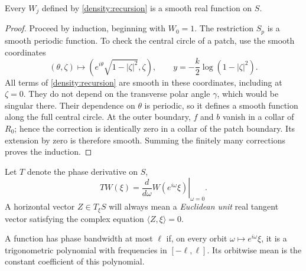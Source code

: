 \begin{lemma}\label{density:smooth}
Every $W_j$ defined by \eqref{density:recursion} is a smooth real
function on $S$.
\end{lemma}

\begin{proof}
Proceed by induction, beginning with $W_0=1$.  The restriction
$S_p$ is a smooth periodic function.  To check the central circle
of a patch, use the smooth coordinates
\[
 (\theta,\zeta)\longmapsto
       (e^{i\theta}\sqrt{1-|\zeta|^2},\zeta),
 \qquad y=-\frac{k}{2}\log(1-|\zeta|^2).
\]
All terms of \eqref{density:recursion} are smooth in these
coordinates, including at $\zeta=0$.  They do not depend on the
transverse polar angle $\gamma$, which would be singular there.
Their dependence on $\theta$ is periodic, so it defines a smooth
function along the full central circle.  At the outer boundary,
$f$ and $b$ vanish in a collar of $R_0$; hence the correction is
identically zero in a collar of the patch boundary.  Its extension
by zero is therefore smooth.  Summing the finitely many corrections
proves the induction.
\end{proof}

Let $T$ denote the phase derivative on $S$,
\[
 TW(\xi)=\left.\frac{d}{d\omega}W(e^{i\omega}\xi)
                  \right|_{\omega=0}.
\]
A horizontal vector $Z\in T_\xi S$ will always mean a
\emph{Euclidean unit} real tangent vector satisfying the complex
equation $\langle Z,\xi\rangle=0$.

A function has phase bandwidth at most $\ell$ if, on every orbit
$\omega\mapsto e^{i\omega}\xi$, it is a trigonometric polynomial
with frequencies in $[-\ell,\ell]$.  Its orbitwise mean is the
constant coefficient of this polynomial.

